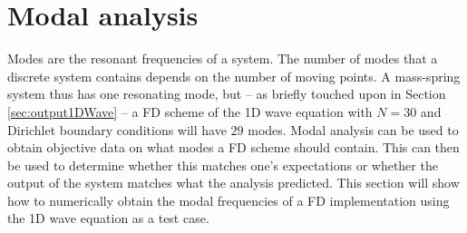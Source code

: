 {{\section{Modal analysis}
\label{sec:modalAnalysis}
Modes are the resonant frequencies of a system. The number of modes that a discrete system contains depends on the number of moving points. A mass-spring system thus has one resonating mode, but -- as briefly touched upon in Section \ref{sec:output1DWave} -- a FD scheme of the 1D wave equation with $N = 30$ and Dirichlet boundary conditions will have $29$ modes. Modal analysis  can be used to obtain objective data on what modes a FD scheme should contain. This can then be used to determine whether this matches one's expectations or whether the output of the system matches what the analysis predicted. This section will show how to numerically obtain the modal frequencies of a FD implementation using the 1D wave equation as a test case.

}}
